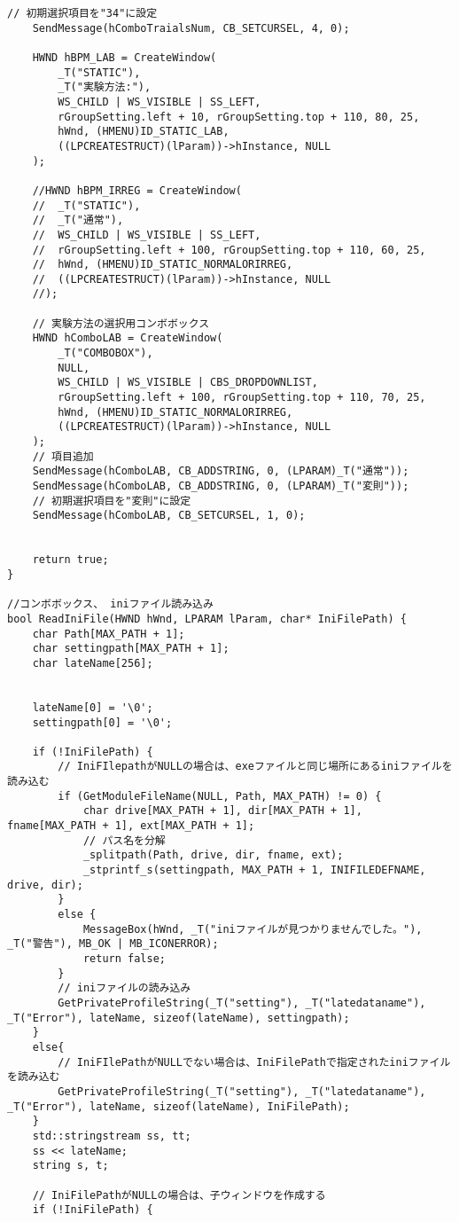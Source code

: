 \begin{lstlisting}[caption=window.cpp]
	// 初期選択項目を"34"に設定
	SendMessage(hComboTraialsNum, CB_SETCURSEL, 4, 0);
	
	HWND hBPM_LAB = CreateWindow(
		_T("STATIC"),
		_T("実験方法:"),
		WS_CHILD | WS_VISIBLE | SS_LEFT,
		rGroupSetting.left + 10, rGroupSetting.top + 110, 80, 25,
		hWnd, (HMENU)ID_STATIC_LAB,
		((LPCREATESTRUCT)(lParam))->hInstance, NULL
	);

	//HWND hBPM_IRREG = CreateWindow(
	//	_T("STATIC"),
	//	_T("通常"),
	//	WS_CHILD | WS_VISIBLE | SS_LEFT,
	//	rGroupSetting.left + 100, rGroupSetting.top + 110, 60, 25,
	//	hWnd, (HMENU)ID_STATIC_NORMALORIRREG,
	//	((LPCREATESTRUCT)(lParam))->hInstance, NULL
	//);
	
	// 実験方法の選択用コンボボックス
	HWND hComboLAB = CreateWindow(
		_T("COMBOBOX"),
		NULL,
		WS_CHILD | WS_VISIBLE | CBS_DROPDOWNLIST,
		rGroupSetting.left + 100, rGroupSetting.top + 110, 70, 25,
		hWnd, (HMENU)ID_STATIC_NORMALORIRREG,
		((LPCREATESTRUCT)(lParam))->hInstance, NULL
	);
	// 項目追加
	SendMessage(hComboLAB, CB_ADDSTRING, 0, (LPARAM)_T("通常"));
	SendMessage(hComboLAB, CB_ADDSTRING, 0, (LPARAM)_T("変則"));
	// 初期選択項目を"変則"に設定
	SendMessage(hComboLAB, CB_SETCURSEL, 1, 0);


	return true;
}

//コンボボックス、 iniファイル読み込み
bool ReadIniFile(HWND hWnd, LPARAM lParam, char* IniFilePath) {
	char Path[MAX_PATH + 1];
	char settingpath[MAX_PATH + 1];
	char lateName[256];


	lateName[0] = '\0';
	settingpath[0] = '\0';

	if (!IniFilePath) {
		// IniFIlepathがNULLの場合は、exeファイルと同じ場所にあるiniファイルを読み込む
		if (GetModuleFileName(NULL, Path, MAX_PATH) != 0) {
			char drive[MAX_PATH + 1], dir[MAX_PATH + 1], fname[MAX_PATH + 1], ext[MAX_PATH + 1];
			// パス名を分解
			_splitpath(Path, drive, dir, fname, ext);
			_stprintf_s(settingpath, MAX_PATH + 1, INIFILEDEFNAME, drive, dir);
		}
		else {
			MessageBox(hWnd, _T("iniファイルが見つかりませんでした。"), _T("警告"), MB_OK | MB_ICONERROR);
			return false;
		}
		// iniファイルの読み込み
		GetPrivateProfileString(_T("setting"), _T("latedataname"), _T("Error"), lateName, sizeof(lateName), settingpath);
	}
	else{
		// IniFIlePathがNULLでない場合は、IniFilePathで指定されたiniファイルを読み込む
		GetPrivateProfileString(_T("setting"), _T("latedataname"), _T("Error"), lateName, sizeof(lateName), IniFilePath);
	}
	std::stringstream ss, tt;
	ss << lateName;
	string s, t;

	// IniFilePathがNULLの場合は、子ウィンドウを作成する
	if (!IniFilePath) {


\end{lstlisting}
